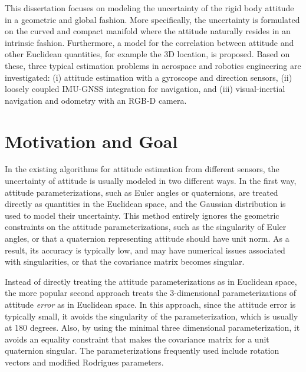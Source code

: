 This dissertation focuses on modeling the uncertainty of the rigid body attitude in a geometric and global fashion.
More specifically, the uncertainty is formulated on the curved and compact manifold where the attitude naturally resides in an intrinsic fashion.
Furthermore, a model for the correlation between attitude and other Euclidean quantities, for example the 3D location, is proposed.
Based on these, three typical estimation problems in aerospace and robotics engineering are investigated: (i) attitude estimation with a gyroscope and direction sensors, (ii) loosely coupled IMU-GNSS integration for navigation, and (iii) visual-inertial navigation and odometry with an RGB-D camera. 

\section{Motivation and Goal}

In the existing algorithms for attitude estimation from different sensors, the uncertainty of attitude is usually modeled in two different ways.
In the first way, attitude parameterizations, such as Euler angles or quaternions, are treated directly as quantities in the Euclidean space, and the Gaussian distribution is used to model their uncertainty.
This method entirely ignores the geometric constraints on the attitude parameterizations, such as the singularity of Euler angles, or that a quaternion representing attitude should have unit norm.
As a result, its accuracy is typically low, and may have numerical issues associated with singularities, or that the covariance matrix becomes singular.

Instead of directly treating the attitude parameterizations as in Euclidean space, the more popular second approach treats the 3-dimensional parameterizations of attitude \textit{error} as in Euclidean space.
In this approach, since the attitude error is typically small, it avoids the singularity of the parameterization, which is usually at 180 degrees.
Also, by using the minimal three dimensional parameterization, it avoids an equality constraint that makes the covariance matrix for a unit quaternion singular.
The parameterizations frequently used include rotation vectors and modified Rodrigues parameters.

